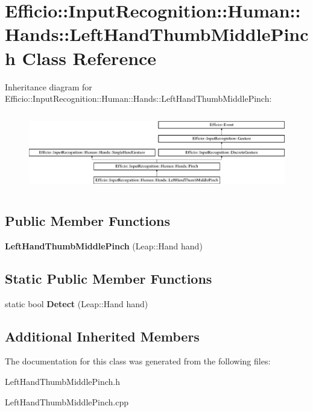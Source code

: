 \hypertarget{class_efficio_1_1_input_recognition_1_1_human_1_1_hands_1_1_left_hand_thumb_middle_pinch}{}\section{Efficio\+:\+:Input\+Recognition\+:\+:Human\+:\+:Hands\+:\+:Left\+Hand\+Thumb\+Middle\+Pinch Class Reference}
\label{class_efficio_1_1_input_recognition_1_1_human_1_1_hands_1_1_left_hand_thumb_middle_pinch}
Inheritance diagram for Efficio\+:\+:Input\+Recognition\+:\+:Human\+:\+:Hands\+:\+:Left\+Hand\+Thumb\+Middle\+Pinch\+:\begin{figure}[H]
\begin{center}
\leavevmode
\includegraphics[height=3.448276cm]{class_efficio_1_1_input_recognition_1_1_human_1_1_hands_1_1_left_hand_thumb_middle_pinch}
\end{center}
\end{figure}
\subsection*{Public Member Functions}
\begin{DoxyCompactItemize}
\item 
{\bfseries Left\+Hand\+Thumb\+Middle\+Pinch} (Leap\+::\+Hand hand)\hypertarget{class_efficio_1_1_input_recognition_1_1_human_1_1_hands_1_1_left_hand_thumb_middle_pinch_ac59b6a5651ca4b824f281050a8d88dfc}{}\label{class_efficio_1_1_input_recognition_1_1_human_1_1_hands_1_1_left_hand_thumb_middle_pinch_ac59b6a5651ca4b824f281050a8d88dfc}

\end{DoxyCompactItemize}
\subsection*{Static Public Member Functions}
\begin{DoxyCompactItemize}
\item 
static bool {\bfseries Detect} (Leap\+::\+Hand hand)\hypertarget{class_efficio_1_1_input_recognition_1_1_human_1_1_hands_1_1_left_hand_thumb_middle_pinch_acf009c48391b08a8eee66073bf8a7073}{}\label{class_efficio_1_1_input_recognition_1_1_human_1_1_hands_1_1_left_hand_thumb_middle_pinch_acf009c48391b08a8eee66073bf8a7073}

\end{DoxyCompactItemize}
\subsection*{Additional Inherited Members}


The documentation for this class was generated from the following files\+:\begin{DoxyCompactItemize}
\item 
Left\+Hand\+Thumb\+Middle\+Pinch.\+h\item 
Left\+Hand\+Thumb\+Middle\+Pinch.\+cpp\end{DoxyCompactItemize}
